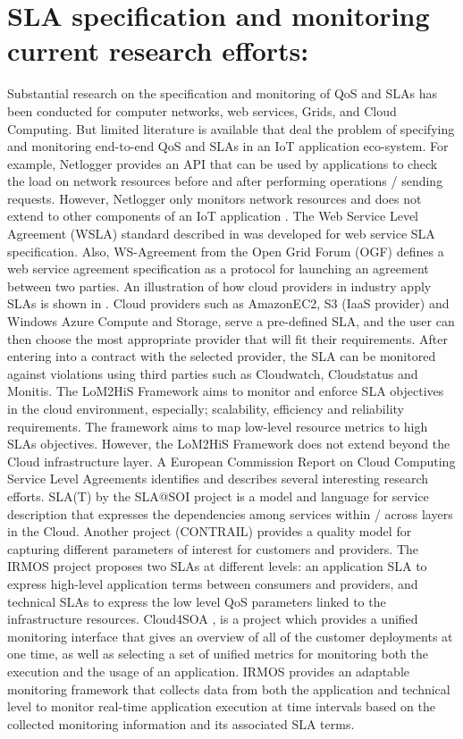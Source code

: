 \section{SLA specification and monitoring current research efforts:}

Substantial research on the specification and monitoring of QoS and SLAs has been conducted for computer networks, web services, Grids, and Cloud Computing.
But limited literature is available that deal the problem of specifying and monitoring end-to-end QoS and SLAs in an IoT application eco-system.
For example, Netlogger provides an API that can be used by applications to check the load on network resources before and after performing operations / sending requests.
However, Netlogger only monitors network resources and does not extend to other components of an IoT application \cite{ref14,ref15}.
The Web Service Level Agreement (WSLA) standard described in \cite{ref16} was developed for web service SLA specification.
Also, WS-Agreement from the Open Grid Forum (OGF) defines a web service agreement specification as a protocol for launching an agreement between two parties.
An illustration of how cloud providers in industry apply SLAs is shown in \cite{ref21}.
Cloud providers such as AmazonEC2, S3 (IaaS provider) and Windows Azure Compute and Storage, serve a pre-defined SLA, and the user can then choose the most appropriate provider that will fit their requirements.
After entering into a contract with the selected provider, the SLA can be monitored against violations using third parties such as Cloudwatch, Cloudstatus and Monitis.
The LoM2HiS Framework \cite{ref14} aims to monitor and enforce SLA objectives in the cloud environment, especially; scalability, efficiency and reliability requirements.
The framework aims to map low-level resource metrics to high SLAs objectives.
However, the LoM2HiS Framework does not extend beyond the Cloud infrastructure layer.
A European Commission Report on Cloud Computing Service Level Agreements \cite{ref24} identifies and describes several interesting research efforts.
SLA(T) by the SLA@SOI project \cite{ref25,ref27} is a model and language for service description that expresses the dependencies among services within / across layers in the Cloud. Another project (CONTRAIL) provides a quality model \cite{ref28} for capturing different parameters of interest for customers and providers.
The IRMOS project \cite{ref3} proposes two SLAs at different levels: an application SLA to express high-level application terms between consumers and providers, and technical SLAs to express the low level QoS parameters linked to the infrastructure resources.
Cloud4SOA \cite{ref31}, is a project which provides a unified monitoring interface that gives an overview of all of the customer deployments at one time, as well as selecting a set of unified metrics for monitoring both the execution and the usage of an application.
IRMOS \cite{ref32} provides an adaptable monitoring framework that collects data from both the application and technical level to monitor real-time application execution at time intervals based on the collected monitoring information and its associated SLA terms. 

